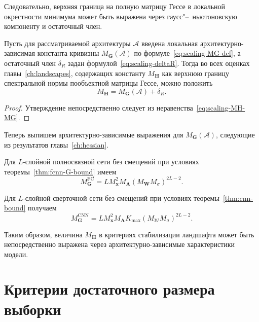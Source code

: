 Следовательно, верхняя граница на полную матрицу Гессе в локальной окрестности минимума может быть выражена через гаусс"--~ньютоновскую компоненту и остаточный член.

\begin{proposition}
    \label{prop:scaling-transfer}
    Пусть для рассматриваемой архитектуры $\mathcal A$ введена локальная архитектурно-зависимая константа кривизны $M_{\mathbf G}(\mathcal A)$ по формуле~\eqref{eq:scaling-MG-def}, а остаточный член $\delta_R$ задан формулой~\eqref{eq:scaling-deltaR}. Тогда во всех оценках главы~\ref{ch:landscapes}, содержащих константу $M_{\mathbf H}$ как верхнюю границу спектральной нормы пообъектной матрицы Гессе, можно положить
    \begin{equation}
        \label{eq:scaling-transfer-MH}
        M_{\mathbf H}
        =
        M_{\mathbf G}(\mathcal A)+\delta_R.
    \end{equation}
\end{proposition}

\begin{proof}
    Утверждение непосредственно следует из неравенства~\eqref{eq:scaling-MH-MG}.
\end{proof}

Теперь выпишем архитектурно-зависимые выражения для $M_{\mathbf G}(\mathcal A)$, следующие из результатов главы~\ref{ch:hessian}.

Для $L$-слойной полносвязной сети без смещений при условиях теоремы~\ref{thm:fcnn-G-bound} имеем
\begin{equation}
    \label{eq:scaling-MG-fcnn}
    M_{\mathbf G}^{\mathrm{FC}}
    =
    L M_{\mathbf x}^2 M_{\mathbf A}(M_{\mathbf W}M_{\sigma})^{2L-2}.
\end{equation}

Для $L$-слойной сверточной сети без смещений при условиях теоремы~\ref{thm:cnn-bound} получаем
\begin{equation}
    \label{eq:scaling-MG-cnn}
    M_{\mathbf G}^{\mathrm{CNN}}
    =
    L M_{\mathbf x}^2 M_{\mathbf A}K_{\max}(M_{\mathcal W}M_{\sigma})^{2L-2}.
\end{equation}

Таким образом, величина $M_{\mathbf H}$ в критериях стабилизации ландшафта может быть непосредственно выражена через архитектурно-зависимые характеристики модели.

\section{Критерии достаточного размера выборки}

